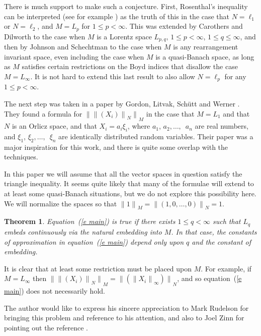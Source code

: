 \documentclass[12pt]{amsart}
\newtheorem{thm}{Theorem}
\newcommand{\snormo}[1]{{\mathopen\|#1\mathclose\|}}
\begin{document}
There is much support to make such a conjecture.  First, Rosenthal's
inequality \cite{rosenthal} can be interpreted (see for example 
\cite{carothers-dilworth})
as the truth of this in the case that $N = \ell_1$ or $N = \ell_2$,
and $M = L_p$ for $1 \le p < \infty$.  This was extended by
Carothers and Dilworth \cite{carothers-dilworth} to the case when
$M$ is a Lorentz space $L_{p,q}$, $1 \le p < \infty$, $1 \le q \le \infty$,
and then by Johnson and Schechtman \cite{johnson-schechtman} to the case
when $M$ is any rearrangement invariant space, even including the case
when $M$ is a quasi-Banach space, as long as $M$ satisfies certain restrictions
on the Boyd indices that disallow the case $M = L_\infty$.
It is not hard to extend this last result to also allow $N = \ell_p$ for any
$1 \le p < \infty$.

The next step was taken in a paper by 
Gordon, Litvak, Sch\"utt and Werner \cite{gordon et al}.
They found a formula for $\snormo{\snormo{(X_i)}_N}_M$ in the case that
$M = L_1$ and that $N$ is an Orlicz space, and that $X_i = a_i \xi_i$,
where $a_1$, $a_2,\dots,$\ $a_n$ are real numbers, and $\xi_1$, 
$\xi_2,\dots,$\ $\xi_n$ are identically distributed random variables.
Their paper was a major inspiration for this work, and there 
is quite some overlap with the techniques.

In this paper we will assume that all the vector spaces in question 
satisfy the triangle inequality.  It seems quite likely that many
of the formulae will extend to at least some quasi-Banach situations,
but we do not explore this possibility here.  We will normalize the
spaces so that $\snormo 1_M = \snormo{(1,0,\dots,0)}_N = 1$.

\begin{thm}
\label{t main}
Equation~(\ref{e main}) is true if there exists $1\le q < \infty$ such that 
$L_q$ embeds continuously via
the natural embedding into $M$.  In that case, the constants of approximation
in equation~(\ref{e main})
depend only upon $q$ and the constant of embedding.
\end{thm}

It is clear that at least some restriction must be placed upon $M$.  
For example,
if $M = L_\infty$ then $\snormo{\snormo{(X_i)}_N}_M = 
\snormo{(\snormo{X_i}_\infty)}_N$, and so equation~(\ref{e main})
does not necessarily hold.

The author would like to express his sincere appreciation to Mark Rudelson for
bringing this problem and reference \cite{gordon et al} to his attention,
and also to Joel Zinn for pointing out the reference \cite{marcus-zinn}.
\end{document}
